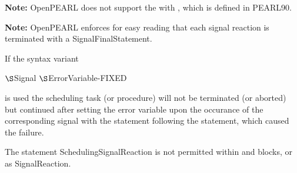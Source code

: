 \begin{grammarframe}



%
\end{grammarframe}

\textbf{Note:} OpenPEARL does not support the  with , which is defined in PEARL90.

\textbf{Note:} OpenPEARL enforces for easy reading that each signal reaction is terminated with a SignalFinalStatement.

If the syntax variant 

\x {} $\S $Signal  \kw{(} $\S $ErrorVariable-FIXED \kw{)} \kw{;}

is used the scheduling task (or procedure) will not be terminated (or aborted)
but continued after setting the error variable upon the occurance 
of the corresponding signal with the statement following the 
statement, which caused the failure.



The statement SchedulingSignalReaction is not permitted within 
and  blocks, or as SignalReaction.

